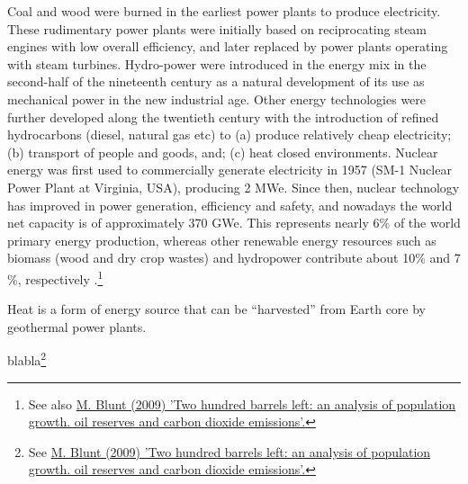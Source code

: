 Coal and wood were burned in the earliest power plants to produce electricity. These rudimentary power plants were initially based on reciprocating steam engines with low overall efficiency, and later replaced by power plants operating with steam turbines. Hydro-power were introduced in the energy mix in the second-half of the nineteenth century as a natural development of its use as mechanical power in the new industrial age. Other energy technologies were further developed along the twentieth century with the introduction of refined hydrocarbons (diesel, natural gas etc) to (a) produce relatively cheap electricity; (b) transport of people and goods, and; (c) heat closed environments. Nuclear energy was first used to commercially generate electricity in 1957 (SM-1 Nuclear Power Plant at Virginia, USA), producing 2 MWe. Since then, nuclear technology has improved in power generation, efficiency and safety, and nowadays the world net capacity is of approximately 370 GWe. This represents nearly 6$\%$ of the world primary energy production, whereas other renewable energy resources such as biomass (\ie wood and dry crop wastes) and hydropower contribute about 10$\%$ and 7$\%$, respectively \citep{AER_2011}.\footnote{See also \href{https://www.imperial.ac.uk/people/r.bryan/document/2407/200barrelsleft2009/?200barrelsleft2009.pdf}{M. Blunt (2009) 'Two hundred barrels left: an analysis of population growth. oil reserves and carbon dioxide emissions'.}}
\medskip

Heat is a form of energy source that can be ``harvested'' from Earth core by geothermal power plants. 




blabla\footnote{See \href{https://www.imperial.ac.uk/people/r.bryan/document/2407/200barrelsleft2009/?200barrelsleft2009.pdf}{M. Blunt (2009) 'Two hundred barrels left: an analysis of population growth. oil reserves and carbon dioxide emissions'.}}


